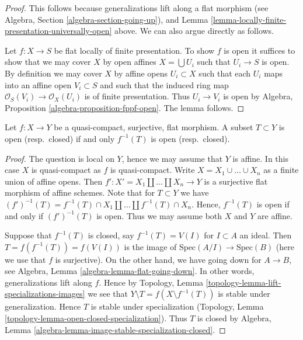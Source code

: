 \begin{proof}
This follows because generalizations lift along a flat morphism
(see Algebra, Section \ref{algebra-section-going-up}), and
Lemma \ref{lemma-locally-finite-presentation-universally-open} above.
We can also argue directly as follows.

\medskip\noindent
Let $f : X \to S$ be flat locally of finite presentation.
To show $f$ is open it suffices to show that we may cover
$X$ by open affines $X = \bigcup U_i$ such that $U_i \to S$
is open. By definition we may cover $X$ by
affine opens $U_i \subset X$ such that each $U_i$ maps
into an affine open $V_i \subset S$ and such that
the induced ring map $\mathcal{O}_S(V_i) \to \mathcal{O}_X(U_i)$ is
of finite presentation. Thus $U_i \to V_i$ is open by
Algebra, Proposition \ref{algebra-proposition-fppf-open}.
The lemma follows.
\end{proof}

\begin{lemma}
\label{lemma-fpqc-quotient-topology}
Let $f : X \to Y$ be a quasi-compact, surjective, flat morphism.
A subset $T \subset Y$ is open (resp.\ closed) if and only
$f^{-1}(T)$ is open (resp.\ closed).
\end{lemma}

\begin{proof}
The question is local on $Y$, hence we may assume that $Y$ is affine.
In this case $X$ is quasi-compact as $f$ is quasi-compact.
Write $X = X_1 \cup \ldots \cup X_n$ as a finite union of affine opens.
Then $f' : X' = X_1 \coprod \ldots \coprod X_n \to Y$ is a surjective
flat morphism of affine schemes. Note that for $T \subset Y$ we have
$(f')^{-1}(T) = f^{-1}(T) \cap X_1 \coprod \ldots \coprod f^{-1}(T) \cap X_n$.
Hence, $f^{-1}(T)$ is open if and only if $(f')^{-1}(T)$ is open.
Thus we may assume both $X$ and $Y$ are affine.

\medskip\noindent
Suppose that $f^{-1}(T)$ is closed, say $f^{-1}(T) = V(I)$ for $I \subset A$
an ideal. Then $T = f(f^{-1}(T)) = f(V(I))$ is the image of
$\text{Spec}(A/I) \to \text{Spec}(B)$ (here we use that $f$
is surjective). On the other hand,
we have going down for $A \to B$, see
Algebra, Lemma \ref{algebra-lemma-flat-going-down}.
In other words, generalizations lift along $f$.
Hence by Topology, Lemma \ref{topology-lemma-lift-specializations-images}
we see that $Y \setminus T = f(X \setminus f^{-1}(T))$ is stable under
generalization. Hence $T$ is stable under specialization
(Topology, Lemma \ref{topology-lemma-open-closed-specialization}).
Thus $T$ is closed by
Algebra, Lemma \ref{algebra-lemma-image-stable-specialization-closed}.
\end{proof}

